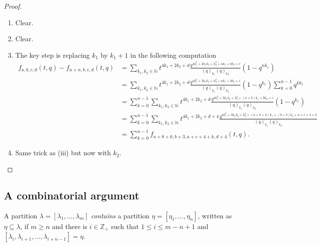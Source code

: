 \documentclass[a4paper, 12pt, reqno]{amsart}
\theoremstyle{remark}
\numberwithin{equation}{subsection}
\begin{document}
\begin{proof}\leavevmode
  \begin{enumerate}
  \item Clear.
  \item Clear.
  \item The key step is replacing $k_1$ by $k_1 + 1$ in the following computation
    \begin{align*}
      f_{a, b, c, d}(t, q) - f_{a + n, b, c, d}(t, q) &= \sum_{k_1, k_2 \in \mathbb{N}}t^{4k_1 + 2k_2 + d}\frac{q^{4k_1^2 + 3k_1k_2 + k_2^2 + ak_1 + bk_2 + c}}{(q)_{k_1}(q)_{k_2}}(1 - q^{nk_1}) \\
      &= \sum_{k_1, k_2 \in \mathbb{N}}t^{4k_1 + 2k_2 + d}\frac{q^{4k_1^2 + 3k_1k_2 + k_2^2 + ak_1 + bk_2 + c}}{(q)_{k_1}(q)_{k_2}}(1 - q^{k_1})\sum_{k = 0}^{n - 1}q^{kk_1} \\
      &= \sum_{k = 0}^{n - 1}\sum_{k_1, k_2 \in \mathbb{N}}t^{4k_1 + 2k_2 + d}\frac{q^{4k_1^2 + 3k_1k_2 + k_2^2 + (a + k)k_1 + bk_2 + c}}{(q)_{k_1}(q)_{k_2}}(1 - q^{k_1}) \\
      &= \sum_{k = 0}^{n - 1}\sum_{k_1, k_2 \in \mathbb{N}}t^{4k_1 + 2k_2 + d + 4}\frac{q^{4k_1^2 + 3k_1k_2 + k_2^2 + (a + 8 + k)k_1 + (b + 3)k_2 + a + c + 4 + k}}{(q)_{k_1}(q)_{k_2}} \\
      &= \sum_{k = 0}^{n - 1}f_{a + 8 + k, b + 3, a + c + 4 + k, d + 4}(t, q).
    \end{align*}
  \item Same trick as (iii) but now with $k_2$. \qedhere
  \end{enumerate}
\end{proof}

\subsection{A combinatorial argument}
\label{sec:comb-argum}

A partition $\lambda = [\lambda_1, \dots, \lambda_m]$ \emph{contains} a partition $\eta = [\eta_1, \dots, \eta_n]$, written as $\eta \subseteq \lambda$, if $m \ge n$ and there is $i \in \mathbb{Z}_+$ such that $1 \le i \le m - n + 1$ and $[\lambda_i, \lambda_{i + 1}, \dots, \lambda_{i + n - 1}] = \eta$.
\end{document}
